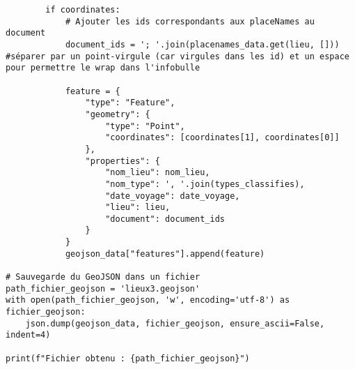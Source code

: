 \begin{verbatim}
        if coordinates:
            # Ajouter les ids correspondants aux placeNames au document
            document_ids = '; '.join(placenames_data.get(lieu, [])) #séparer par un point-virgule (car virgules dans les id) et un espace pour permettre le wrap dans l'infobulle
            
            feature = {
                "type": "Feature",
                "geometry": {
                    "type": "Point",
                    "coordinates": [coordinates[1], coordinates[0]]
                },
                "properties": {
                    "nom_lieu": nom_lieu,
                    "nom_type": ', '.join(types_classifies),
                    "date_voyage": date_voyage,
                    "lieu": lieu,
                    "document": document_ids
                }
            }
            geojson_data["features"].append(feature)

# Sauvegarde du GeoJSON dans un fichier
path_fichier_geojson = 'lieux3.geojson'
with open(path_fichier_geojson, 'w', encoding='utf-8') as fichier_geojson:
    json.dump(geojson_data, fichier_geojson, ensure_ascii=False, indent=4)

print(f"Fichier obtenu : {path_fichier_geojson}")
\end{verbatim}
